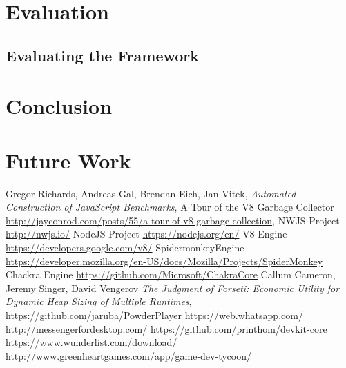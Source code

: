 \documentclass{l4proj}
\begin{document}
\section{Evaluation}
\subsection{Evaluating the Framework}
\section{Conclusion}
\section{Future Work}

\begin{thebibliography}{9}
  Gregor Richards, Andreas Gal, Brendan Eich, Jan Vitek,
  \emph{Automated Construction of JavaScript Benchmarks},
A Tour of the V8 Garbage Collector
\url{http://jayconrod.com/posts/55/a-tour-of-v8-garbage-collection},
  NWJS Project
  \url{http://nwjs.io/}
  NodeJS Project
  \url{https://nodejs.org/en/}
  V8 Engine
  \url{https://developers.google.com/v8/}
SpidermonkeyEngine
\url{https://developer.mozilla.org/en-US/docs/Mozilla/Projects/SpiderMonkey}
Chackra Engine
\url{https://github.com/Microsoft/ChakraCore}
  Callum Cameron, Jeremy Singer, David Vengerov
  \emph{The Judgment of Forseti: Economic Utility for Dynamic Heap Sizing of Multiple Runtimes},
  https://github.com/jaruba/PowderPlayer
https://web.whatsapp.com/
http://messengerfordesktop.com/
https://github.com/printhom/devkit-core
https://www.wunderlist.com/download/
http://www.greenheartgames.com/app/game-dev-tycoon/
\end{thebibliography}
\end{document}
